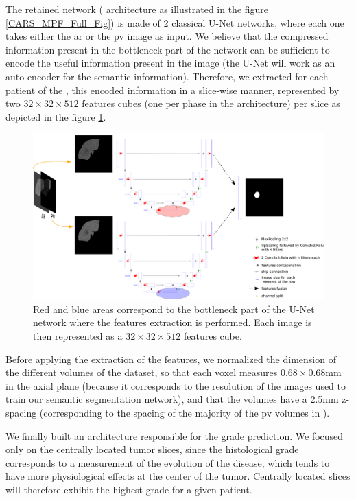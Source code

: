 The retained network ( architecture as illustrated in the figure \ref{CARS_MPF_Full_Fig}) is made of 2 classical U-Net networks, where each
one takes either the \ac{ar} or the \ac{pv} image as input. We believe
that the compressed information present in the bottleneck part of the
network can be sufficient to encode the useful information present in the
image (the U-Net will work as an auto-encoder for the semantic information). Therefore, we extracted for each patient of the , this
encoded information in a slice-wise manner, represented by two $ 32\times32\times512 $
features cubes (one per phase in the  architecture) per slice
as depicted in the figure \ref{fig:MPF_Features_Selection}.


\begin{figure}[th!]
\centering
\includegraphics[width=0.95\linewidth]{images/MPF_Features_Selection}
\caption{Red and blue areas correspond to the bottleneck part of the U-Net
network where the features extraction is performed. Each image is then
represented as a $ 32\times32\times512 $ features cube.}
\label{fig:MPF_Features_Selection}
\end{figure}


Before applying the extraction of the features, we normalized
the dimension of the different volumes of the dataset, so that each
voxel measures $ 0.68\times0.68 $mm in the axial plane (because it corresponds to
the resolution of the images used to train our semantic segmentation
network), and that the volumes have a 2.5mm z-spacing (corresponding to the
spacing of the majority of the \ac{pv} volumes in ).

We finally built an architecture responsible for the grade prediction.
We focused only on the centrally located tumor slices, since the
histological grade corresponds to a measurement of the evolution of the
disease, which tends to have more physiological effects at the center of
the tumor. Centrally located slices will therefore exhibit the highest
grade for a given patient.

